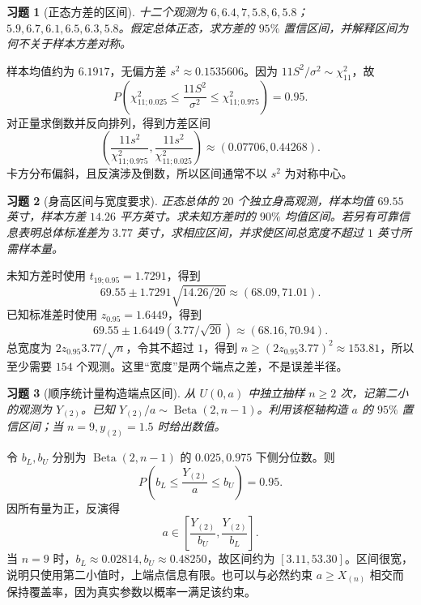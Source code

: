 \documentclass[UTF8,12pt,a4paper,fontset=fandol]{ctexart}
\newtheorem{exercise}{习题}[section]
\begin{document}
\begin{exercise}[正态方差的区间]\label{q:M-P10-3}
十二个观测为 $6,6.4,7,5.8,6,5.8$；$5.9,6.7,6.1,6.5,6.3,5.8$。假定总体正态，求方差的 $95\%$ 置信区间，并解释区间为何不关于样本方差对称。\par{}
\end{exercise}

\begin{solve}\label{a:M-P10-3}样本均值约为 $6.1917$，无偏方差 $s^2\approx0.1535606$。因为 $11S^2/\sigma^2\sim\chi^2_{11}$，故\[P\left(\chi^2_{11;0.025}\le\frac{11S^2}{\sigma^2}\le\chi^2_{11;0.975}\right)=0.95.\]对正量求倒数并反向排列，得到方差区间\[\left(\frac{11s^2}{\chi^2_{11;0.975}},\frac{11s^2}{\chi^2_{11;0.025}}\right)\approx(0.07706,0.44268).\]卡方分布偏斜，且反演涉及倒数，所以区间通常不以 $s^2$ 为对称中心。\end{solve}

\begin{exercise}[身高区间与宽度要求]\label{q:M-P11-1}
正态总体的 $20$ 个独立身高观测，样本均值 $69.55$ 英寸，样本方差 $14.26$ 平方英寸。求未知方差时的 $90\%$ 均值区间。若另有可靠信息表明总体标准差为 $3.77$ 英寸，求相应区间，并求使区间总宽度不超过 $1$ 英寸所需样本量。\par{}
\end{exercise}

\begin{solve}\label{a:M-P11-1}未知方差时使用 $t_{19;0.95}=1.7291$，得到\[69.55\pm1.7291\sqrt{14.26/20}\approx(68.09,71.01).\]已知标准差时使用 $z_{0.95}=1.6449$，得到\[69.55\pm1.6449(3.77/\sqrt{20})\approx(68.16,70.94).\]总宽度为 $2z_{0.95}3.77/\sqrt n$，令其不超过 $1$，得到 $n\ge(2z_{0.95}3.77)^2\approx153.81$，所以至少需要 $154$ 个观测。这里“宽度”是两个端点之差，不是误差半径。\end{solve}

\begin{exercise}[顺序统计量构造端点区间]\label{q:M-P11-2}
从 $U(0,a)$ 中独立抽样 $n\ge2$ 次，记第二小的观测为 $Y_{(2)}$。已知 $Y_{(2)}/a\sim\operatorname{Beta}(2,n-1)$。利用该枢轴构造 $a$ 的 $95\%$ 置信区间；当 $n=9,y_{(2)}=1.5$ 时给出数值。\par{}
\end{exercise}

\begin{solve}\label{a:M-P11-2}令 $b_L,b_U$ 分别为 $\operatorname{Beta}(2,n-1)$ 的 $0.025,0.975$ 下侧分位数。则\[P\left(b_L\le\frac{Y_{(2)}}a\le b_U\right)=0.95.\]因所有量为正，反演得\[a\in\left[\frac{Y_{(2)}}{b_U},\frac{Y_{(2)}}{b_L}\right].\]当 $n=9$ 时，$b_L\approx0.02814,b_U\approx0.48250$，故区间约为 $[3.11,53.30]$。区间很宽，说明只使用第二小值时，上端点信息有限。也可以与必然约束 $a\ge X_{(n)}$ 相交而保持覆盖率，因为真实参数以概率一满足该约束。\end{solve}
\end{document}
